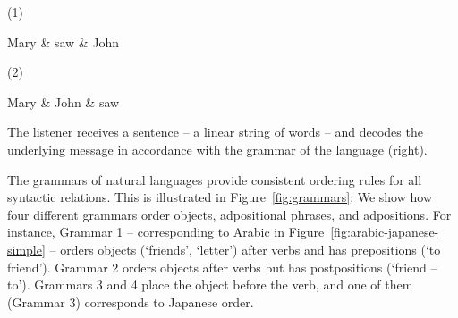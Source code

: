 \documentclass[9pt,twocolumn,twoside,lineno]{pnas-new}
\newcommand{\key}[1]{\textbf{#1}}
\begin{document}
(1)
\begin{dependency}[theme=simple]
    \begin{deptext}
    Mary \& saw \& John \\
    \end{deptext}
\end{dependency}
(2)
\begin{dependency}[theme=simple]
    \begin{deptext}
    Mary \& John  \& saw \\
    \end{deptext}
\end{dependency}

The listener receives a sentence -- a linear string of words -- and decodes the underlying message in accordance with the grammar of the language (right).



The grammars of natural languages provide consistent ordering rules for all syntactic relations.
This is illustrated in Figure~\ref{fig:grammars}:
We show how four different grammars order objects, adpositional phrases, and adpositions.
For instance, Grammar 1 -- corresponding to Arabic in Figure~\ref{fig:arabic-japanese-simple} -- orders objects (`friends', `letter') after verbs and has prepositions (`to friend').
Grammar 2 orders objects after verbs but has postpositions (`friend -- to').
Grammars 3 and 4 place the object before the verb, and one of them (Grammar 3) corresponds to Japanese order.
\end{document}
